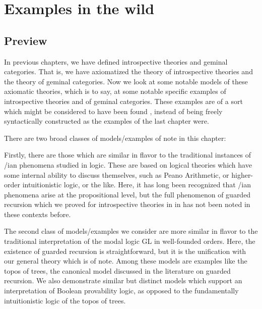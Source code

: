 \filestart

\section{Examples in the wild}

\subsection{Preview}
In previous chapters, we have defined introspective theories and geminal categories. That is, we have axiomatized the theory of introspective theories and the theory of geminal categories. Now we look at some notable models of these axiomatic theories, which is to say, at some notable specific examples of introspective theories and of geminal categories. These examples are of a sort which might be considered to have been found , instead of being freely syntactically constructed as the examples of the last chapter were.

There are two broad classes of models/examples of note in this chapter:

Firstly, there are those which are similar in flavor to the traditional instances of \Goedel/ian phenomena studied in logic. These are based on logical theories which have some internal ability to discuss themselves, such as Peano Arithmetic, or higher-order intuitionistic logic, or the like. Here, it has long been recognized that \Goedel/ian phenomena arise at the propositional level, but the full phenomenon of guarded recursion which we proved for introspective theories in \TODO in has not been noted in these contexts before.

The second class of models/examples we consider are more similar in flavor to the traditional interpretation of the modal logic GL in well-founded orders. Here, the existence of guarded recursion is straightforward, but it is the unification with our general theory which is of note. Among these models are examples like the topos of trees, the canonical model discussed in the literature on guarded recursion. We also demonstrate similar but distinct models which support an interpretation of Boolean provability logic, as opposed to the fundamentally intuitionistic logic of the topos of trees.

